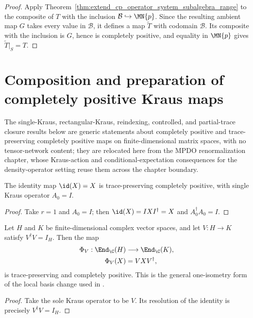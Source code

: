 \begin{proof}\leanok
    Apply Theorem~\ref{thm:extend_cp_operator_system_subalgebra_range} to the
    composite of $T$ with the inclusion $\mathcal B\hookrightarrow\MN{p}$.
    Since the resulting ambient map $G$ takes every value in $\mathcal B$, it
    defines a map $\widetilde T$ with codomain $\mathcal B$. Its composite
    with the inclusion is $G$, hence is completely positive, and equality in
    $\MN{p}$ gives $\widetilde T|_S=T$.
\end{proof}

\section{Composition and preparation of completely positive Kraus maps}%
\label{sec:aux_kraus_composition}

The single-Kraus, rectangular-Kraus, reindexing, controlled, and
partial-trace closure results below are generic statements about completely
positive and trace-preserving completely positive maps on finite-dimensional
matrix spaces, with no tensor-network content; they are relocated here from
the MPDO renormalization chapter, whose Kraus-action and
conditional-expectation consequences for the density-operator setting reuse
them across the chapter boundary.

\begin{lemma}
    \label{lem:is_kraus_cptp_id}
    \leanok
    The identity map $\id(X)=X$ is trace-preserving completely positive,
    with single Kraus operator $A_0=I$.
\end{lemma}
\begin{proof}
    \leanok
    Take $r=1$ and $A_0=I$; then $\id(X)=IXI^\dagger=X$ and
    $A_0^\dagger A_0=I$.
\end{proof}

\begin{theorem}
    \label{thm:mpdo_single_kraus_isometry_cptp}
    \leanok
    Let $H$ and $K$ be finite-dimensional complex vector spaces, and let
    $V:H\to K$ satisfy $V^\dagger V=I_H$. Then the map
    \begin{align}
        \Phi_V:\End_{\C}(H)&\longrightarrow\End_{\C}(K),
        \notag\\
        \Phi_V(X)&=VXV^\dagger,
        \notag
    \end{align}
    is trace-preserving and completely positive. This is the general
    one-isometry form of the local basis change used in
    \cite[Appendix~C.2, lines~1439 and~1520]{Cirac2016MPDO_arXiv}.
\end{theorem}
\begin{proof}
    \leanok
    Take the sole Kraus operator to be $V$. Its resolution of the identity is
    precisely $V^\dagger V=I_H$.
\end{proof}

